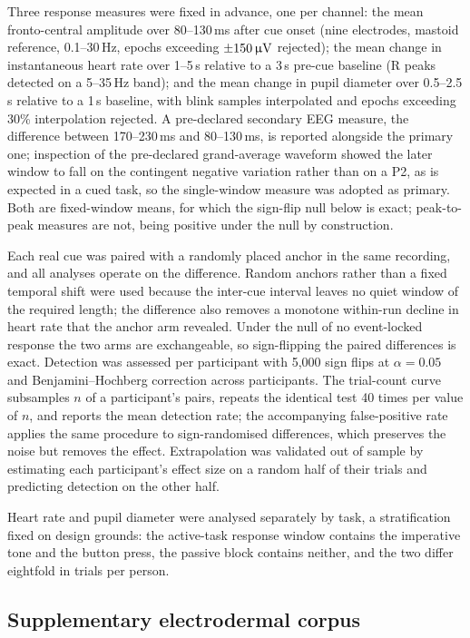 Three response measures were fixed in advance, one per channel: the mean
fronto-central amplitude over 80--130\,ms after cue onset (nine electrodes,
mastoid reference, 0.1--30\,Hz, epochs exceeding $\pm 150\,\upmu\mathrm{V}$ rejected); the mean
change in instantaneous heart rate over 1--5\,s relative to a 3\,s pre-cue baseline
(R peaks detected on a 5--35\,Hz band); and the mean change in pupil diameter over
0.5--2.5\,s relative to a 1\,s baseline, with blink samples interpolated and epochs
exceeding 30\% interpolation rejected. A pre-declared secondary EEG measure, the
difference between 170--230\,ms and 80--130\,ms, is reported alongside the primary
one; inspection of the pre-declared grand-average waveform showed the later window
to fall on the contingent negative variation rather than on a P2, as is expected in
a cued task, so the single-window measure was adopted as primary. Both are
fixed-window means, for which the sign-flip null below is exact; peak-to-peak
measures are not, being positive under the null by construction.

Each real cue was paired with a randomly placed anchor in the same recording, and
all analyses operate on the difference. Random anchors rather than a fixed temporal
shift were used because the inter-cue interval leaves no quiet window of the
required length; the difference also removes a monotone within-run decline in heart
rate that the anchor arm revealed. Under the null of no event-locked response the
two arms are exchangeable, so sign-flipping the paired differences is exact.
Detection was assessed per participant with 5,000 sign flips at $\alpha = 0.05$ and
Benjamini--Hochberg correction across participants. The trial-count curve
subsamples $n$ of a participant's pairs, repeats the identical test 40 times per
value of $n$, and reports the mean detection rate; the accompanying false-positive
rate applies the same procedure to sign-randomised differences, which preserves the
noise but removes the effect. Extrapolation was validated out of sample by
estimating each participant's effect size on a random half of their trials and
predicting detection on the other half.

Heart rate and pupil diameter were analysed separately by task, a stratification
fixed on design grounds: the active-task response window contains the imperative
tone and the button press, the passive block contains neither, and the two differ
eightfold in trials per person.

\subsection*{Supplementary electrodermal corpus}

